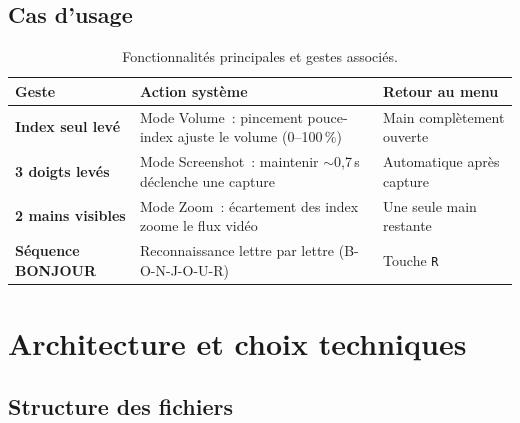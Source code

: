 \documentclass[12pt,a4paper]{article}
\begin{document}
\subsection{Cas d'usage}

\begin{table}[H]
\centering
\caption{Fonctionnalit\'es principales et gestes associ\'es.}
\label{tab:usecases}
\small
\begin{tabularx}{\textwidth}{>{\bfseries}p{3.5cm} X p{4cm}}
\toprule
\textbf{Geste} & \textbf{Action syst\`eme} & \textbf{Retour au menu} \\
\midrule
Index seul lev\'e & Mode Volume~: pincement pouce-index ajuste le volume (0--100\,\%) & Main compl\`etement ouverte \\
3 doigts lev\'es & Mode Screenshot~: maintenir $\sim$0,7\,s d\'eclenche une capture & Automatique apr\`es capture \\
2 mains visibles & Mode Zoom~: \'ecartement des index zoome le flux vid\'eo & Une seule main restante \\
S\'equence BONJOUR & Reconnaissance lettre par lettre (B-O-N-J-O-U-R) & Touche \texttt{R} \\
\bottomrule
\end{tabularx}
\end{table}

\newpage

\section{Architecture et choix techniques}
\label{sec:architecture}

\subsection{Structure des fichiers}
\end{document}
